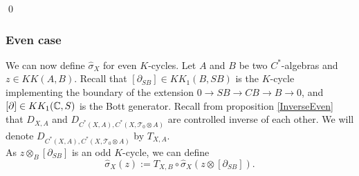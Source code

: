 \begin{dem}
\begin{enumerate}

\end{enumerate}
\qed
\end{dem}

\subsubsection{Even case} %

We can now define $\hat\sigma_X$ for even $K$-cycles. Let $A$ and $B$ be two $C^*$-algebras and $z\in KK(A,B)$. Recall that $[\partial_{SB}]\in KK_1(B,SB)$ is the $K$-cycle implementing the boundary of the extension $0\rightarrow SB\rightarrow CB\rightarrow B\rightarrow 0$, and $[\partial]\in KK_1(\mathbb C,S)$ is the Bott generator. Recall from proposition \ref{InverseEven} that $D_{X,A}$  and $D_{ C^*(X,A),C^*(X,\mathcal T_0\otimes A) }$ are controlled inverse of each other. We will denote $D_{ C^*(X,A),C^*(X,\mathcal T_0\otimes A) }$ by $T_{X,A}$.\\

As $z\otimes_B [\partial_{SB}]$ is an odd $K$-cycle, we can define
\[\hat\sigma_X(z):= T_{X,B}\circ \hat\sigma_X(z\otimes[\partial_{SB}]).\] 



